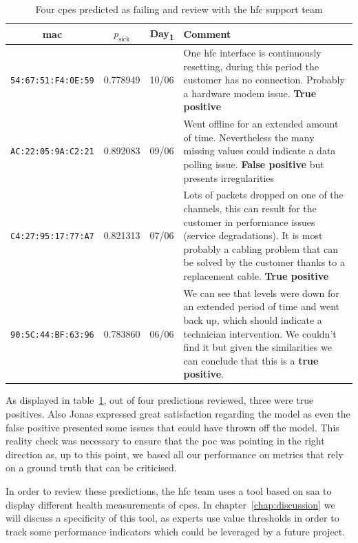 \begin{table}[h]
\begin{center}
\begin{tabular}{c c c p{90mm}}
\hline
\textbf{\acrshort{mac}} & \textbf{$p_\text{sick}$} & \textbf{Day\textsubscript{1}} & \textbf{Comment} \\ 
\hline\hline
\texttt{54:67:51:F4:0E:59} & 0.778949 & 10/06 & One \acrshort{hfc} interface is continuously resetting, during this period the customer has no connection. Probably a hardware modem issue. \textbf{True positive}\\
\hline
\texttt{AC:22:05:9A:C2:21} & 0.892083 & 09/06 & Went offline for an extended amount of time. Nevertheless the many missing values could indicate a data polling issue. \textbf{False positive} but presents irregularities\\
\hline
\texttt{C4:27:95:17:77:A7} & 0.821313 & 07/06 & Lots of packets dropped on one of the channels, this can result for the customer in performance issues (service degradations). It is most probably a cabling problem that can be solved by the customer thanks to a replacement cable. \textbf{True positive}\\
\hline
\texttt{90:5C:44:BF:63:96} & 0.783860 & 06/06 &  We can see that levels were down for an extended period of time and went back up, which should indicate a technician intervention. We couldn't find it but given the similarities we can conclude that this is a \textbf{true positive}.\\
\end{tabular}
\end{center}
\caption{\label{checks} Four \acrshort{cpe}s predicted as failing and review with the \acrshort{hfc} support team}
\end{table}

As displayed in table~\ref{checks}, out of four predictions reviewed, three were true positives. Also Jonas expressed great satisfaction regarding the model as even the false positive presented some issues that could have thrown off the model. This reality check was necessary to ensure that the \acrshort{poc} was pointing in the right direction as, up to this point, we based all our performance on metrics that rely on a ground truth that can be criticised. 

In order to review these predictions, the \acrshort{hfc} team uses a tool based on \acrshort{saa} to display different health measurements of \acrshort{cpe}s. In chapter~\ref{chap:discussion} we will discuss a specificity of this tool, as experts use value thresholds in order to track some performance indicators which could be leveraged by a future project.

